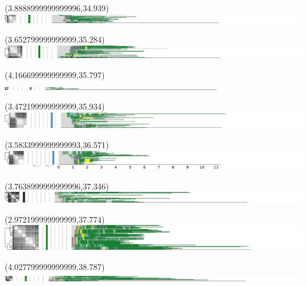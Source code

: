 \documentclass{article}
\begin{document}
\begin{textblock}{13}(3.8888999999999996,34.939)\includegraphics{haplotypes-constrained/chr22-HG003.pdf}\end{textblock}
\begin{textblock}{13}(3.652799999999999,35.284)\includegraphics{haplotypes-constrained/chr22-HG004.pdf}\end{textblock}
\begin{textblock}{13}(4.166699999999999,35.797)\includegraphics{haplotypes-constrained/chr22-HG005.pdf}\end{textblock}
\begin{textblock}{13}(3.472199999999999,35.934)\includegraphics{haplotypes-constrained/chr22-HG006.pdf}\end{textblock}
\begin{textblock}{13}(3.5833999999999993,36.571)\includegraphics{haplotypes-constrained/chr22-HG007.pdf}\end{textblock}
\begin{textblock}{13}(3.7638999999999996,37.346)\includegraphics{haplotypes-constrained/chrX-HG001.pdf}\end{textblock}
\begin{textblock}{13}(2.972199999999999,37.774)\includegraphics{haplotypes-constrained/chrX-HG002.pdf}\end{textblock}
\begin{textblock}{13}(4.027799999999999,38.787)\includegraphics{haplotypes-constrained/chrX-HG003.pdf}\end{textblock}
\end{document}
